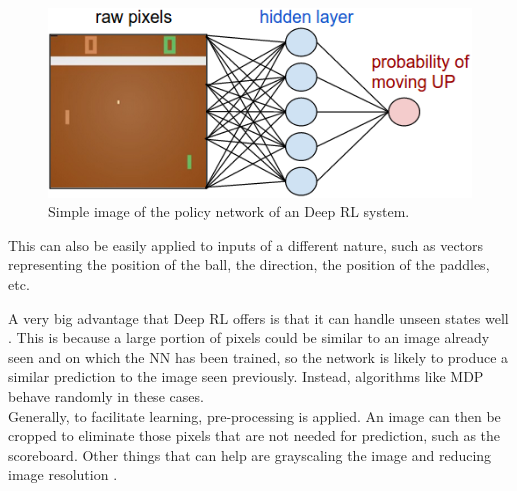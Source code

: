 \begin{figure}[ht]
    \centering
    \includegraphics[scale=0.4]{images/DRL_network.png}
    \caption{Simple image of the policy network of an Deep RL system.}
    \label{fig:DRL_network}
\end{figure}

This can also be easily applied to inputs of a different nature, such as vectors representing the position of the ball, the direction, the position of the paddles, etc.

A very big advantage that Deep RL offers is that it can handle unseen states well \cite{mnih2013playing} \cite{karpathy2016deep}.
This is because a large portion of pixels could be similar to an image already seen and on which the NN has been trained, so the network is likely to produce a similar prediction to the image seen previously. Instead, algorithms like MDP behave randomly in these cases. \\

Generally, to facilitate learning, pre-processing is applied.
An image can then be cropped to eliminate those pixels that are not needed for prediction, such as the scoreboard. Other things that can help are grayscaling the image and reducing image resolution \cite{mnih2013playing}.
